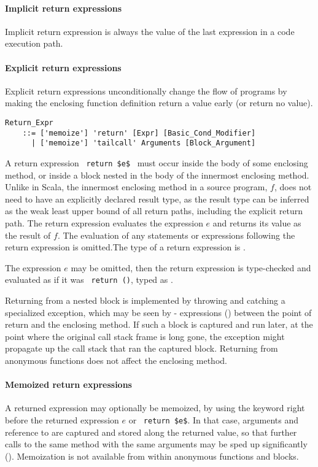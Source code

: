 \paragraph{Implicit return expressions}
Implicit return expression is always the value of the last expression in a code execution path. 

\paragraph{Explicit return expressions}
Explicit return expressions unconditionally change the flow of programs by making the enclosing function definition return a value early (or return no value). 

\grammar\begin{lstlisting}
Return_Expr 
    ::= ['memoize'] 'return' [Expr] [Basic_Cond_Modifier]
      | ['memoize'] 'tailcall' Arguments [Block_Argument]
\end{lstlisting}

A return expression ~\lstinline!return $e$!~ must occur inside the body of some enclosing method, or inside a block nested in the body of the innermost enclosing method. Unlike in Scala, the innermost enclosing method in a source program, $f$, does not need to have an explicitly declared result type, as the result type can be inferred as the weak least upper bound of all return paths, including the explicit return path. The return expression evaluates the expression $e$ and returns its value as the result of $f$. The evaluation of any statements or expressions following the return expression is omitted.The type of a return expression is .

The expression $e$ may be omitted, then the return expression  is type-checked and evaluated as if it was ~\lstinline!return ()!, typed as . 

Returning from a nested block is implemented by throwing and catching a specialized exception, which may be seen by - expressions () between the point of return and the enclosing method. If such a block is captured and run later, at the point where the original call stack frame is long gone, the exception might propagate up the call stack that ran the captured block. Returning from anonymous functions does not affect the enclosing method. 

\paragraph{Memoized return expressions}
A returned expression may optionally be memoized, by using the keyword  right before the returned expression $e$ or ~\lstinline!return $e$!. In that case, arguments and reference to  are captured and stored along the returned value, so that further calls to the same method with the same arguments may be sped up significantly (). Memoization is not available from within anonymous functions and blocks. 

